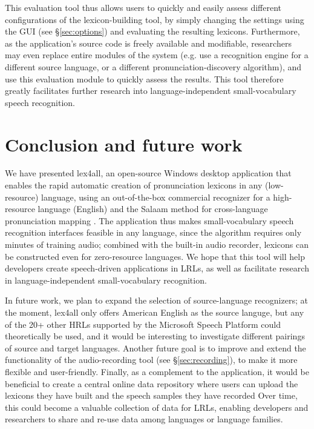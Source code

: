 \documentclass[11pt]{article}
\begin{document}
This evaluation tool thus allows users to quickly and easily assess different configurations of the lexicon-building tool, by simply changing the settings using the GUI (see \S\ref{sec:options}) and evaluating the resulting lexicons. Furthermore, as the application's source code is freely available and modifiable, researchers may even replace entire modules of the system (e.g. use a recognition engine for a different source language, or a different pronunciation-discovery algorithm), and use this evaluation module to quickly assess the results. This tool therefore greatly facilitates further research into language-independent small-vocabulary speech recognition. 

\section{Conclusion and future work}
\label{sec:future}

We have presented lex4all, an open-source Windows desktop application that enables the rapid automatic creation of pronunciation lexicons in any (low-resource) language, using an out-of-the-box commercial recognizer \cite{mspsdk} for a high-resource language (English) and the Salaam method for cross-language pronunciation mapping \cite{Qiao10,Chan12}. The application thus makes small-vocabulary speech recognition interfaces feasible in any language, since the algorithm requires only minutes of training audio; combined with the built-in audio recorder, lexicons can be constructed even for zero-resource languages. We hope that this tool will help developers create speech-driven applications in LRLs, as well as facilitate research in language-independent small-vocabulary recognition.

In future work, we plan 
to expand the selection of source-language recognizers; at the moment, lex4all only offers American English as the source languge, but any of the 20+ other HRLs supported by the Microsoft Speech Platform could theoretically be used, and it would be interesting to investigate different pairings of source and target languages. Another future goal is to improve and extend the functionality of the audio-recording tool (see \S\ref{sec:recording}), 
to make it more flexible and user-friendly.
Finally, as a complement to the application, it would be beneficial to 
create a central online data repository where users can 
upload the lexicons they have built and the speech samples they have recorded %
Over time, this could become a valuable collection of data for LRLs, enabling developers and researchers to share and re-use data among languages or language families.
\end{document}
